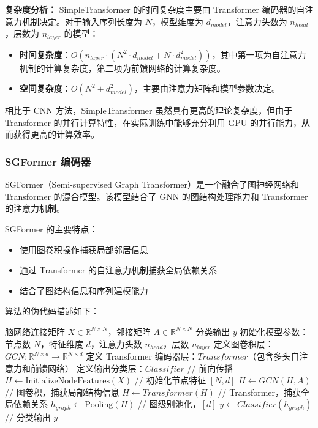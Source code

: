 \documentclass[12pt,a4paper]{article}
\begin{document}
\textbf{复杂度分析：}
SimpleTransformer 的时间复杂度主要由 Transformer 编码器的自注意力机制决定。对于输入序列长度为 $N$，模型维度为 $d_{model}$，注意力头数为 $n_{head}$，层数为 $n_{layer}$ 的模型：
\begin{itemize}
\item \textbf{时间复杂度}：$O(n_{layer} \cdot (N^2 \cdot d_{model} + N \cdot d_{model}^2))$，其中第一项为自注意力机制的计算复杂度，第二项为前馈网络的计算复杂度。
\item \textbf{空间复杂度}：$O(N^2 + d_{model}^2)$，主要由注意力矩阵和模型参数决定。
\end{itemize}

相比于 CNN 方法，SimpleTransformer 虽然具有更高的理论复杂度，但由于 Transformer 的并行计算特性，在实际训练中能够充分利用 GPU 的并行能力，从而获得更高的计算效率。

\subsubsection{SGFormer 编码器}

SGFormer（Semi-supervised Graph Transformer）是一个融合了图神经网络和 Transformer 的混合模型\cite{thomas2021sgformer}。该模型结合了 GNN 的图结构处理能力和 Transformer 的注意力机制。

SGFormer 的主要特点：
\begin{itemize}
\item 使用图卷积操作捕获局部邻居信息
\item 通过 Transformer 的自注意力机制捕获全局依赖关系
\item 结合了图结构信息和序列建模能力
\end{itemize}

算法的伪代码描述如下：

\begin{algorithm}[H]
\caption{SGFormer}
\begin{algorithmic}[1]
\REQUIRE 脑网络连接矩阵 $X \in \mathbb{R}^{N \times N}$，邻接矩阵 $A \in \mathbb{R}^{N \times N}$
\ENSURE 分类输出 $y$
\STATE 初始化模型参数：节点数 $N$，特征维度 $d$，注意力头数 $n_{head}$，层数 $n_{layer}$
\STATE 定义图卷积层：$GCN: \mathbb{R}^{N \times d} \rightarrow \mathbb{R}^{N \times d}$
\STATE 定义 Transformer 编码器层：$Transformer$（包含多头自注意力和前馈网络）
\STATE 定义输出分类层：$Classifier$
\STATE // 前向传播
\STATE $H \leftarrow \text{InitializeNodeFeatures}(X)$ \quad // 初始化节点特征 $[N, d]$
    \STATE $H \leftarrow GCN(H, A)$ \quad // 图卷积，捕获局部结构信息
    \STATE $H \leftarrow Transformer(H)$ \quad // Transformer，捕获全局依赖关系
\ENDFOR
\STATE $h_{graph} \leftarrow \text{Pooling}(H)$ \quad // 图级别池化，$[d]$
\STATE $y \leftarrow Classifier(h_{graph})$ \quad // 分类输出
\RETURN $y$
\end{algorithmic}
\end{algorithm}
\end{document}
